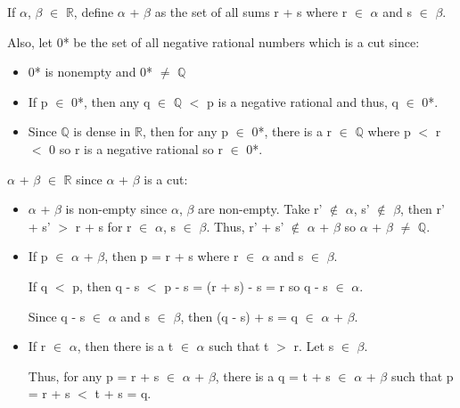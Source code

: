 	\begin{adjustbox}{minipage=14cm, right, vspace=0.1cm 0cm}
		If $\alpha$, $\beta$ $\in$ $\mathbb{R}$, define $\alpha$ + $\beta$ as the set of all
		sums r + s where r $\in$ $\alpha$ and s $\in$ $\beta$.

		Also, let 0* be the set of all negative rational numbers which is a cut since:
		
			\begin{itemize}[leftmargin=1cm, itemsep=0.1cm]
				\item 0* is nonempty and 0* $\not =$ $\mathbb{Q}$

				\item If p $\in$ 0*, then any q $\in$ $\mathbb{Q}$ $<$ p is a negative rational
					and thus, q $\in$ 0*.

				\item Since $\mathbb{Q}$ is dense in $\mathbb{R}$, then for any p $\in$ 0*,
					there is a r $\in$ $\mathbb{Q}$ where p $<$ r $<$ 0 so r is a
					negative rational so r $\in$ 0*.
			\end{itemize}

		$\alpha$ + $\beta$ $\in$ $\mathbb{R}$ since $\alpha$ + $\beta$ is a cut:

			\begin{itemize}[leftmargin=1cm, itemsep=0.1cm]
				\item $\alpha$ + $\beta$ is non-empty since $\alpha$, $\beta$ are non-empty.
					Take r' $\not \in$ $\alpha$, s' $\not \in$ $\beta$, then
					r' + s' $>$ r + s for r $\in$ $\alpha$, s $\in$ $\beta$.
					Thus, r' + s' $\not \in$ $\alpha$ + $\beta$ so
					$\alpha$ + $\beta$ $\neq$ $\mathbb{Q}$.

				\item If p $\in$ $\alpha$ + $\beta$, then p = r + s where r $\in$ $\alpha$
					and s $\in$ $\beta$.

					If q $<$ p, then q - s $<$ p - s = (r + s) - s = r so q - s $\in$ $\alpha$.

					Since q - s $\in$ $\alpha$ and s $\in$ $\beta$, then
					(q - s) + s = q $\in$ $\alpha$ + $\beta$.

				\item If r $\in$ $\alpha$, then there is a t $\in$ $\alpha$ such that t $>$ r.
					Let s $\in$ $\beta$.

					Thus, for any p = r + s $\in$ $\alpha$ + $\beta$, there is a
					q = t + s $\in$ $\alpha$ + $\beta$ such that p = r + s $<$ t + s = q.
			\end{itemize}


\end{adjustbox}
